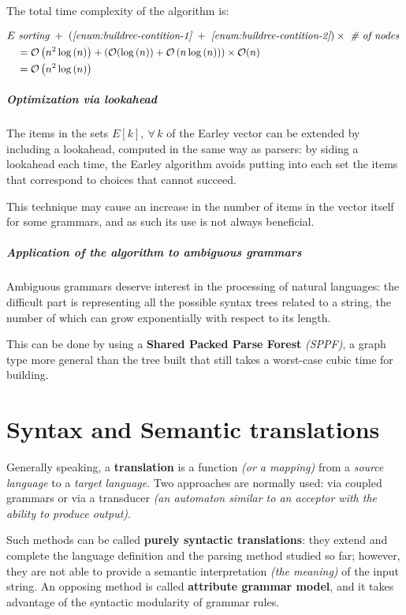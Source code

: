 \documentclass[english]{article}
\begin{document}
The total time complexity of the algorithm is:

\begin{align*}
   & E \ \textit{sorting} \ + \ \left(\textit{\ref{enum:buildree-contition-1}} \ + \ \textit{\ref{enum:buildree-contition-2}} \right) \times \ \textit{\# of nodes} \ \\
   & \quad = \mathcal{O}\left( n^2 \log{(n)} \right) + \left( \mathcal{O}(\log{(n)}) + \mathcal{O}\left( n \log{(n)} \right) \right) \times \mathcal{O}(n)            \\
   & \quad = \mathcal{O}\left( n^2 \log{(n)} \right)
\end{align*}

\subparagraph*{Optimization via lookahead}

The items in the sets \(E[k], \ \forall \, k\) of the Earley vector can be extended by including a lookahead, computed in the same way as \elro parsers:
by siding a lookahead each time, the Earley algorithm avoids putting into each set the items that correspond to choices that cannot succeed.

This technique may cause an increase in the number of items in the vector itself for some grammars, and as such its use is not always beneficial.

\subparagraph*{Application of the algorithm to ambiguous grammars}

Ambiguous grammars deserve interest in the processing of natural languages:
the difficult part is representing all the possible syntax trees related to a string, the number of which can grow exponentially with respect to its length.

This can be done by using a \textbf{Shared Packed Parse Forest} \textit{(SPPF)}, a graph type more general than the tree built that still takes a worst-case cubic time for building.

\clearpage

\section{Syntax and Semantic translations}

Generally speaking, a \textbf{translation} is a function \textit{(or a mapping)} from a \textit{source language} to a \textit{target language}.
Two approaches are normally used:
via coupled grammars or via a transducer \textit{(an automaton similar to an acceptor with the ability to produce output)}.

Such methods can be called \textbf{purely syntactic translations}:
they extend and complete the language definition and the parsing method studied so far; however, they are not able to provide a semantic interpretation \textit{(the meaning)} of the input string.
An opposing method is called \textbf{attribute grammar model}, and it takes advantage of the syntactic modularity of grammar rules.
\end{document}
